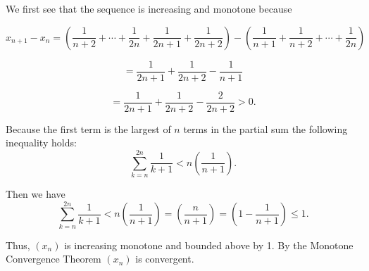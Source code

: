 \documentclass{report}
\begin{document}
\begin{myproof}

We first see that the sequence is increasing and monotone because 

$$x_{n+1} - x_{n}= 
\left(\frac{1}{n+2}+\cdots+\frac{1}{2 n} + \frac{1}{2n+1} + \frac{1}{2n+2} \right) - \left(\frac{1}{n+1}+\frac{1}{n+2}+\cdots+\frac{1}{2 n}\right)$$  

$$ =  \frac{1}{2n+1} + \frac{1}{2n+2} - \frac{1}{n+1}$$

$$ =  \frac{1}{2n+1} + \frac{1}{2n+2} - \frac{2}{2n+2} > 0.$$



Because the first term is the largest of $n$ terms in the partial sum   the following inequality holds:
$$ \sum_{k =n}^{2n} \frac{1}{k+1} < n\left(\frac{1}{n+1}\right).$$

Then we have
$$ \sum_{k =n}^{2n} \frac{1}{k+1} < n\left(\frac{1}{n+1}\right) = \left(\frac{n}{n+1}\right) =\left(1 - \frac{1}{n + 1}\right) \leq 1.$$

Thus, $(x_n)$ is increasing monotone and bounded above by 1. By the Monotone Convergence Theorem $(x_n)$ is convergent.

\end{myproof}



\end{document}
